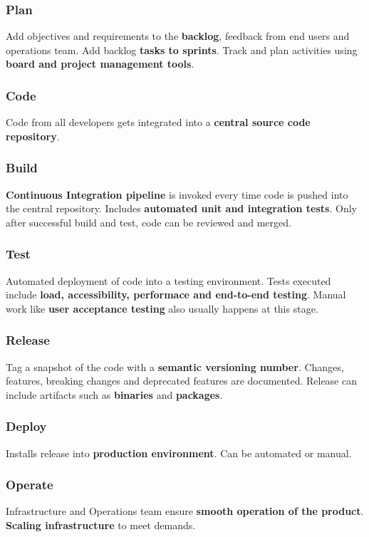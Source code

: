 \subsubsection{Plan}
Add objectives and requirements to the \textbf{backlog}, feedback from end users and operations team. 
Add backlog \textbf{tasks to sprints}. Track and plan activities using \textbf{board and project management tools}. 
\subsubsection{Code}
Code from all developers gets integrated into a \textbf{central source code repository}. 
\subsubsection{Build}
\textbf{Continuous Integration pipeline} is invoked every time code is pushed into the central repository. 
Includes \textbf{automated unit and integration tests}. Only after successful build and test, code can be reviewed and merged.     
\subsubsection{Test}
Automated deployment of code into a testing environment. Tests executed include \textbf{load, accessibility, performace and end-to-end testing}. 
Manual work like \textbf{user acceptance testing} also usually happens at this stage.    

\subsubsection{Release}
Tag a snapshot of the code with a \textbf{semantic versioning number}. Changes, features, breaking changes and deprecated features are documented.
Release can include artifacts such as \textbf{binaries} and \textbf{packages}. 

\subsubsection{Deploy}
Installs release into \textbf{production environment}. Can be automated or manual.

\subsubsection{Operate}
Infrastructure and Operations team ensure \textbf{smooth operation of the product}. \textbf{Scaling infrastructure} to meet demands.

